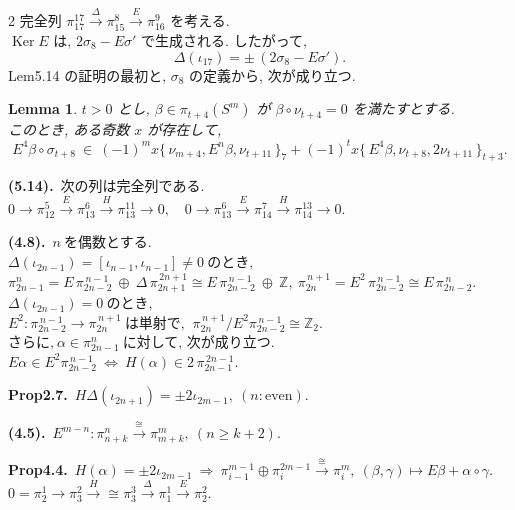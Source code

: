 \documentclass[10pt, leqno]{ltjsarticle}
\newcommand{\todai}[2][]{\{\,#2\,\}_{#1}}      %
\newcommand{\Ker}{\operatorname{Ker}}
\newcommand{\pit}[2]{\pi_{#1}^{#2}}
\numberwithin{equation}{section}
\theoremstyle{plain}
\newtheorem{lemma}[theorem]{Lemma}
\theoremstyle{definition}
\theoremstyle{remark}
\begin{document}
\begin{paracol}{2}
完全列 
\(\pi^{17}_{17}\xrightarrow{\Delta}\pi^{8}_{15}\xrightarrow{E}\pi^{9}_{16}\)
を考える. \\
\(\Ker E\) は, \(2\sigma_{8}-E\sigma'\) で生成される. 
したがって, 
\begin{equation}\label{eq:5.16}
\Delta(\iota_{17})=\pm\,(2\sigma_{8}-E\sigma').
\end{equation}
Lem5.14 の証明の最初と, \(\sigma_8\) の定義から, 次が成り立つ. 
\begin{lemma}\label{lem:5.16}
\(t>0\) とし, \(\beta\in\pi_{t+4}(S^{m})\) が 
\(\beta\circ \nu_{t+4}=0\) を満たすとする. \\
このとき, ある奇数 \(x\) が存在して,
\[
E^{4}\beta\circ \sigma_{t+8}\ \in\
(-1)^{m}x\todai[7]{\nu_{m+4}, E^{n}\beta, \nu_{t+11}}
+ (-1)^{t}x \todai[t+3]{E^{4}\beta, \nu_{t+8}, 2\nu_{t+11}}.
\]
\end{lemma}

\switchcolumn

\noindent
\textbf{(5.14).}\
次の列は完全列である.\\
\(
0\to \pi^{5}_{12}\xrightarrow{E}\pi^{6}_{13}\xrightarrow{H}\pi^{11}_{13}\to0,
\quad
0\to \pi^{6}_{13}\xrightarrow{E}\pi^{7}_{14}\xrightarrow{H}\pi^{13}_{14}\to0 .
\)

\noindent
\textbf{(4.8).}\
\( n \ \text{を偶数とする. } \)\\
\(\Delta(\iota_{2n-1})=[\iota_{n-1},\iota_{n-1}]\ne0 \ \text{のとき, }\)\\
\(\pit{2n-1}{n}
=E\,\pit{2n-2}{\,n-1}\ \oplus\ \Delta\,\pit{2n+1}{\,2n+1}
\cong E\,\pit{2n-2}{\,n-1}\ \oplus\ \mathbb{Z},\ \pit{2n}{\,n+1} = E^{2}\,\pit{2n-2}{\,n-1} 
\cong E\,\pit{2n-2}{\,n}.\)\\
\(\Delta(\iota_{2n-1})=0 \ \text{のとき, }\)\\
\(E^{2}:\pit{2n-2}{\,n-1}\to\pit{2n}{\,n+1}\ \text{は単射で, }\
\pit{2n}{\,n+1}/E^{2}\pit{2n-2}{\,n-1}\cong\mathbb{Z}_2 . \)\\
\(\text{さらに,}\ \alpha\in\pit{2n-1}{n} \ \text{に対して, 次が成り立つ. }\)\\
\(E\alpha\in E^{2}\pit{2n-2}{\,n-1} \ \Leftrightarrow \
H(\alpha)\in 2\,\pit{2n-1}{\,2n-1} .\)

\noindent
\textbf{Prop2.7.}\
\(H\Delta(\iota_{2n+1}) = \pm2\iota_{2m-1},\ (n:\text{even})\).

\noindent
\textbf{(4.5).}\
\(E^{m-n}:\pit{n+k}{n}\xrightarrow{\cong}\pit{m+k}{m},\
(n\ge k+2). \)

\noindent
\textbf{Prop4.4.}\
\(H(\alpha) = \pm 2\iota_{2m-1}\ \Longrightarrow\
\pit{i-1}{m-1}\oplus\pit{i}{2m-1}\xrightarrow{\cong}\pit{i}{m},\
(\beta,\gamma)\mapsto E\beta+\alpha\circ\gamma.\)\\
\(0=\pit{2}{1}\to\pit{3}{2}
\xrightarrow{H}{\cong}\pit{3}{3}
\xrightarrow{\Delta}\pit{1}{1}
\xrightarrow{E}\pit{2}{2}.\)



\end{paracol}
\end{document}
